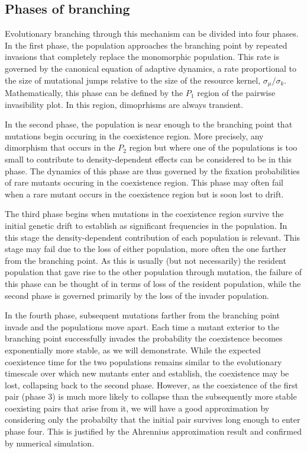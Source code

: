 \documentclass[authoryear,review,11pt]{elsarticle}
\begin{document}
\subsection{Phases of branching}
Evolutionary branching through this mechanism can be divided into four phases.  In the first phase, the population approaches the branching point by repeated invasions that completely replace the monomorphic population.  This rate is governed by the canonical equation of adaptive dynamics, a rate proportional to the size of mutational jumps relative to the size of the resource kernel, $\sigma_{\mu}/\sigma_k$.  Mathematically, this phase can be defined by the $P_1$ region of the pairwise invasibility plot.  In this region, dimoprhisms are always transient.  

In the second phase, the population is near enough to the branching point that mutations begin occuring in the coexistence region.  More precisely, any dimorphism that occurs in the $P_2$ region but where one of the populations is too small to contribute to density-dependent effects can be considered to be in this phase.  The dynamics of this phase are thus governed by the fixation probabilities of rare mutants occuring in the coexistence region.  This phase may often fail when a rare mutant occurs in the coexistence region but is soon lost to drift.  

The third phase begins when mutations in the coexistence region survive the initial genetic drift to establish as significant frequencies in the population.  In this stage the density-dependent contribution of each population is relevant.  This stage may fail due to the loss of either population, more often the one farther from the branching point.  As this is usually (but not necessarily) the resident population that gave rise to the other population through mutation, the failure of this phase can be thought of in terms of loss of the resident population, while the second phase is governed primarily by the loss of the invader population.  

In the fourth phase, subsequent mutations farther from the branching point invade and the populations move apart.  Each time a mutant exterior to the branching point successfully invades the probability the coexistence becomes exponentially more stable, as we will demonstrate.  While the expected coexistence time for the two populations remains similar to the evolutionary timescale over which new mutants enter and establish, the coexistence may be lost, collapsing back to the second phase.  However, as the coexistence of the first pair (phase 3) is much more likely to collapse than the subsequently more stable coexisting pairs that arise from it, we will have a good approximation by considering only the probabilty that the initial pair survives long enough to enter phase four.  This is justified by the Ahrennius approximation result and confirmed by numerical simulation.
\end{document}
